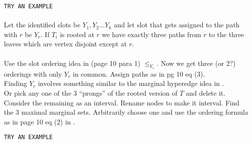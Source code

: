 \documentclass{llncs}
\begin{document}
{\tt TRY AN EXAMPLE}\\\\


\noindent
Let the identified slots be $Y_1, Y_2 ... Y_k$ and let slot that gets
assigned to the path with $r$ be $Y_r$. If $T_i$ is rooted at $r$ we
have exactly three paths from $r$ to the three leaves which are vertex
disjoint except at $r$. \\\\
Use the slot ordering idea in \cite{kklv10} (page 10 para 1)
$\le_{Y_r}$. Now we get three (or 2?) orderings with only $Y_r$ in
common. Assign paths as in pg 10 eq (3). \\
Finding $Y_r$ involves something similar to the marginal hyperedge
idea in \cite{kklv10}.\\
Or pick any one of the 3 ``prongs'' of the rooted version of $T$ and
delete it. Consider the remaining as an interval. Rename nodes to make
it interval. Find the 3 maximal marginal sets. Arbitrarily choose one
and use the ordering formula as in page 10 eq (2) in \cite{kklv10}.

{\tt TRY AN EXAMPLE}\\\\







%

\end{document}
